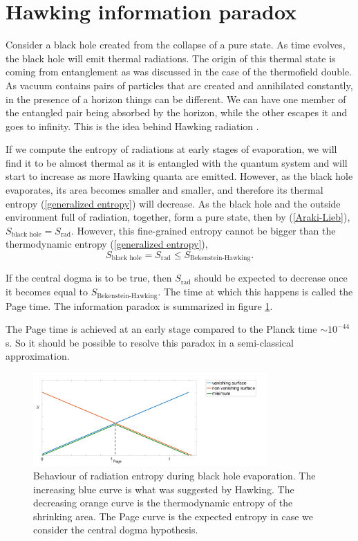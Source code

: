 \section{Hawking information paradox}

Consider a black hole created from the collapse of a pure state. As time evolves, the black hole will emit thermal radiations. The origin of this thermal state is coming from entanglement as was discussed in the case of the thermofield double. As vacuum contains pairs of particles that are created and annihilated constantly, in the presence of a horizon things can be different. We can have one member of the entangled pair being absorbed by the horizon, while the other escapes it  and goes to infinity. This is the idea behind Hawking radiation \cite{Hawking1975}.

If we compute the entropy of radiations at early stages of evaporation, we will find it to be almost thermal as it is entangled with the quantum system and will start to increase as more Hawking quanta are emitted. However, as the black hole evaporates, its area becomes smaller and smaller, and therefore its thermal entropy (\ref{generalized entropy}) will decrease. As the black hole and the outside environment full of radiation, together, form a pure state, then by (\ref{Araki-Lieb}), $S_{\text{black hole}}=S_\text{rad}$. However, this fine-grained entropy cannot be bigger than the thermodynamic entropy (\ref{generalized entropy}),
\begin{equation}
    S_{\text{black hole}}=S_\text{rad}\leq S_\text{Bekenstein-Hawking}.
\end{equation}

If the central dogma is to be true, then $S_\text{rad}$ should be expected to decrease once it becomes equal to $S_\text{Bekenstein-Hawking}$. The time at which this happens is called the Page time. The information paradox is summarized in figure \ref{Page curve}.

The Page time is achieved at an early stage compared to the Planck time $\sim 10^{-44}$s. So it should be possible to resolve this paradox in a semi-classical approximation.

\begin{figure}
    \centering
    \includegraphics[width=0.8\textwidth]{figures/page_island.png}
    \caption{Behaviour of radiation entropy during black hole evaporation. The increasing blue curve is what was suggested by Hawking. The decreasing orange curve is the thermodynamic entropy of the shrinking area. The Page curve is the expected entropy in case we consider the central dogma hypothesis.}
    \label{Page curve}
\end{figure}

